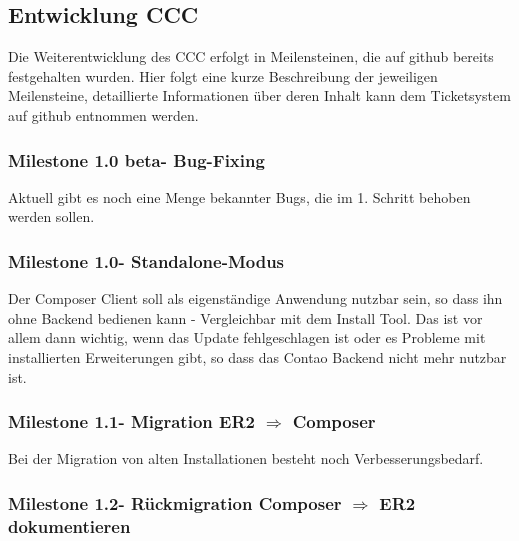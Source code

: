 \documentclass[
paper=a4,
draft=false,%
fontsize=10pt%
]{scrartcl}
\begin{document}
\subsection{Entwicklung CCC}
\label{subsec:ccc}

Die Weiterentwicklung des CCC erfolgt in Meilensteinen, die auf github bereits festgehalten wurden. Hier folgt eine kurze Beschreibung der jeweiligen Meilensteine, detaillierte Informationen über deren Inhalt kann dem Ticketsystem auf github entnommen werden.

\subsubsection[Milestone 1.0 beta - Bug-Fixing]{Milestone 1.0 beta\footnotemark - Bug-Fixing}
\label{subsec:ccc-milestone-1.0-beta}

Aktuell gibt es noch eine Menge bekannter Bugs, die im 1. Schritt behoben werden sollen.

\subsubsection[Milestone 1.0 - Standalone-Modus]{Milestone 1.0\footnotemark - Standalone-Modus}
\label{subsec:ccc-milestone-1.0}

Der Composer Client soll als eigenständige Anwendung nutzbar sein, so dass ihn ohne Backend bedienen kann - Vergleichbar mit dem Install Tool. Das ist vor allem dann wichtig, wenn das Update fehlgeschlagen ist oder es Probleme mit installierten Erweiterungen gibt, so dass das Contao Backend nicht mehr nutzbar ist.

\subsubsection[Milestone 1.1 - Migration ER2 $ \Rightarrow $ Composer]{Milestone 1.1\footnotemark - Migration ER2 $ \Rightarrow $ Composer}
\label{subsec:ccc-milestone-1.1}

Bei der Migration von alten Installationen besteht noch Verbesserungsbedarf.

\subsubsection[Milestone 1.2 - Rückmigration Composer $ \Rightarrow $ ER2 dokumentieren]{Milestone 1.2\footnotemark - Rückmigration Composer $ \Rightarrow $ ER2 dokumentieren}
\label{subsec:ccc-milestone-1.2}
\end{document}
